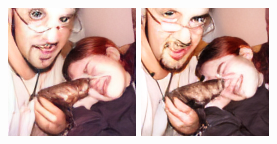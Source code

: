\begin{figure}[h]
\begin{minipage}{0.15\textwidth}
    \end{minipage}
    \begin{minipage}{0.15\textwidth}
        \centering
        \includegraphics[width=\linewidth]{material/1k/281.png}
    \end{minipage}
    \begin{minipage}{0.15\textwidth}
        \centering
        \includegraphics[width=\linewidth]{material/8k/281.png}

\end{minipage}
\end{figure}
